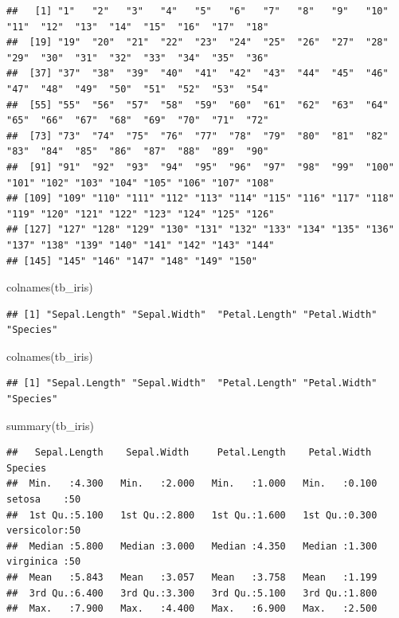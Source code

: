\documentclass[
]{book}
\newenvironment{Shaded}{\begin{snugshade}}{\end{snugshade}}
\newcommand{\FunctionTok}[1]{\textcolor[rgb]{0.00,0.00,0.00}{#1}}
\newcommand{\NormalTok}[1]{#1}
\begin{document}
\begin{verbatim}
##   [1] "1"   "2"   "3"   "4"   "5"   "6"   "7"   "8"   "9"   "10"  "11"  "12"  "13"  "14"  "15"  "16"  "17"  "18" 
##  [19] "19"  "20"  "21"  "22"  "23"  "24"  "25"  "26"  "27"  "28"  "29"  "30"  "31"  "32"  "33"  "34"  "35"  "36" 
##  [37] "37"  "38"  "39"  "40"  "41"  "42"  "43"  "44"  "45"  "46"  "47"  "48"  "49"  "50"  "51"  "52"  "53"  "54" 
##  [55] "55"  "56"  "57"  "58"  "59"  "60"  "61"  "62"  "63"  "64"  "65"  "66"  "67"  "68"  "69"  "70"  "71"  "72" 
##  [73] "73"  "74"  "75"  "76"  "77"  "78"  "79"  "80"  "81"  "82"  "83"  "84"  "85"  "86"  "87"  "88"  "89"  "90" 
##  [91] "91"  "92"  "93"  "94"  "95"  "96"  "97"  "98"  "99"  "100" "101" "102" "103" "104" "105" "106" "107" "108"
## [109] "109" "110" "111" "112" "113" "114" "115" "116" "117" "118" "119" "120" "121" "122" "123" "124" "125" "126"
## [127] "127" "128" "129" "130" "131" "132" "133" "134" "135" "136" "137" "138" "139" "140" "141" "142" "143" "144"
## [145] "145" "146" "147" "148" "149" "150"
\end{verbatim}

\begin{Shaded}
\begin{Highlighting}[]
\FunctionTok{colnames}\NormalTok{(tb\_iris)}
\end{Highlighting}
\end{Shaded}

\begin{verbatim}
## [1] "Sepal.Length" "Sepal.Width"  "Petal.Length" "Petal.Width"  "Species"
\end{verbatim}

\begin{Shaded}
\begin{Highlighting}[]
\FunctionTok{colnames}\NormalTok{(tb\_iris)}
\end{Highlighting}
\end{Shaded}

\begin{verbatim}
## [1] "Sepal.Length" "Sepal.Width"  "Petal.Length" "Petal.Width"  "Species"
\end{verbatim}

\begin{Shaded}
\begin{Highlighting}[]
\FunctionTok{summary}\NormalTok{(tb\_iris)}
\end{Highlighting}
\end{Shaded}

\begin{verbatim}
##   Sepal.Length    Sepal.Width     Petal.Length    Petal.Width          Species  
##  Min.   :4.300   Min.   :2.000   Min.   :1.000   Min.   :0.100   setosa    :50  
##  1st Qu.:5.100   1st Qu.:2.800   1st Qu.:1.600   1st Qu.:0.300   versicolor:50  
##  Median :5.800   Median :3.000   Median :4.350   Median :1.300   virginica :50  
##  Mean   :5.843   Mean   :3.057   Mean   :3.758   Mean   :1.199                  
##  3rd Qu.:6.400   3rd Qu.:3.300   3rd Qu.:5.100   3rd Qu.:1.800                  
##  Max.   :7.900   Max.   :4.400   Max.   :6.900   Max.   :2.500
\end{verbatim}
\end{document}
